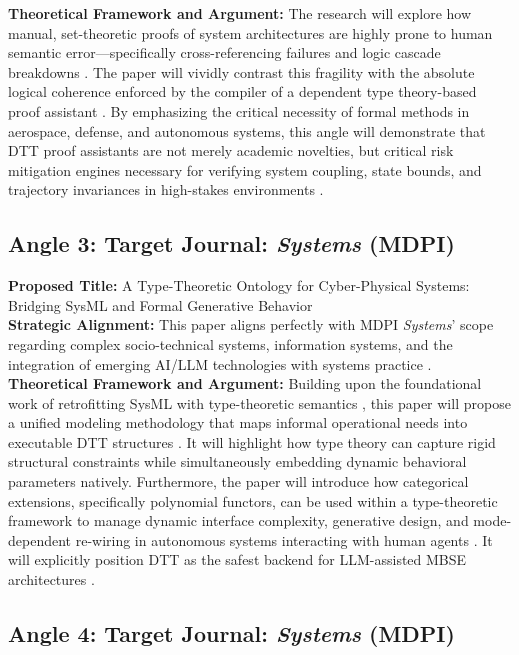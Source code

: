 \documentclass[11pt]{article}
\begin{document}
\textbf{Theoretical Framework and Argument:} The research will explore how manual, set-theoretic proofs of system architectures are highly prone to human semantic error---specifically cross-referencing failures and logic cascade breakdowns \parencite{Ref27}. The paper will vividly contrast this fragility with the absolute logical coherence enforced by the compiler of a dependent type theory-based proof assistant \parencite{Ref21, Ref27}. By emphasizing the critical necessity of formal methods in aerospace, defense, and autonomous systems, this angle will demonstrate that DTT proof assistants are not merely academic novelties, but critical risk mitigation engines necessary for verifying system coupling, state bounds, and trajectory invariances in high-stakes environments \parencite{Ref7, Ref39, Ref59, Ref67}.\subsection{Angle 3: Target Journal: \textit{Systems} (MDPI)}
\noindent \textbf{Proposed Title:} A Type-Theoretic Ontology for Cyber-Physical Systems: Bridging SysML and Formal Generative Behavior\\
\textbf{Strategic Alignment:} This paper aligns perfectly with MDPI \textit{Systems}' scope regarding complex socio-technical systems, information systems, and the integration of emerging AI/LLM technologies with systems practice \parencite{Ref42, Ref64, Ref65}.\\
\textbf{Theoretical Framework and Argument:} Building upon the foundational work of retrofitting SysML with type-theoretic semantics \parencite{Ref4}, this paper will propose a unified modeling methodology that maps informal operational needs into executable DTT structures \parencite{Ref68}. It will highlight how type theory can capture rigid structural constraints while simultaneously embedding dynamic behavioral parameters natively. Furthermore, the paper will introduce how categorical extensions, specifically polynomial functors, can be used within a type-theoretic framework to manage dynamic interface complexity, generative design, and mode-dependent re-wiring in autonomous systems interacting with human agents \parencite{Ref45, Ref47, Ref49}. It will explicitly position DTT as the safest backend for LLM-assisted MBSE architectures \parencite{Ref65}.\subsection{Angle 4: Target Journal: \textit{Systems} (MDPI)}
\end{document}
